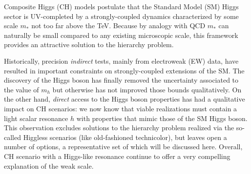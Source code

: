 Composite Higgs (CH) models postulate that the Standard Model (SM) Higgs sector is UV-completed by a strongly-coupled dynamics characterized by some scale $m_*$ not too far above the TeV. Because by analogy with QCD $m_*$ can naturally be small compared to any existing microscopic scale, this framework provides an attractive solution to the hierarchy problem. 

Historically, precision {\emph{indirect}} tests, mainly from electroweak (EW) data, have resulted in important constraints on strongly-coupled extensions of the SM. The discovery of the Higgs boson has finally removed the uncertainty associated to the value of $m_h$ but otherwise has not improved those bounds qualitatively. On the other hand, {\emph{direct}} access to the Higgs boson properties has had a qualitative impact on CH scenarios: we now know that viable realizations must contain a light scalar resonance $h$ with properties that mimic those of the SM Higgs boson. This observation excludes solutions to the hierarchy problem realized via the so-called Higgless scenarios (like old-fashioned technicolor), but leaves open a number of options, a representative set of which will be discussed here. Overall, CH scenario with a Higgs-like resonance continue to offer a very compelling explanation of the weak scale.




